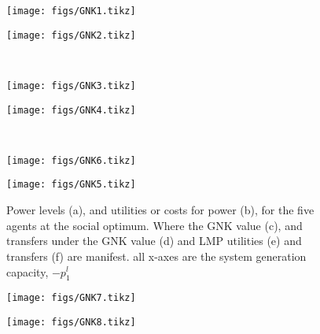     \begin{figure}[]
	\centering
    \begin{minipage}[t]{.48\linewidth}
        \texttt{[image: figs/GNK1.tikz]}
    \end{minipage}
    \begin{minipage}[t]{.48\linewidth}
        \texttt{[image: figs/GNK2.tikz]}
    \end{minipage}\\
    \vspace{5mm}
    \begin{minipage}[t]{.48\linewidth}
        \texttt{[image: figs/GNK3.tikz]}
    \end{minipage}
    \begin{minipage}[t]{.48\linewidth}
        \texttt{[image: figs/GNK4.tikz]}
    \end{minipage}\\
    \vspace{5mm}
    \begin{minipage}[t]{.48\linewidth}
        \texttt{[image: figs/GNK6.tikz]}
    \end{minipage}
    \begin{minipage}[t]{.48\linewidth}
        \texttt{[image: figs/GNK5.tikz]}
    \end{minipage}
    \vspace{0.3\baselineskip}
    \caption{Power levels (a), and utilities or costs for power (b), for the five agents at the social optimum. Where the GNK value (c), and transfers under the GNK value (d) and LMP utilities (e) and transfers (f) are manifest. all x-axes are the system generation capacity, $-p_1^l$}\label{fig:1}
\end{figure}


\begin{figure}
	\centering
        \texttt{[image: figs/GNK7.tikz]}
\end{figure}


\begin{figure}
	\centering
        \texttt{[image: figs/GNK8.tikz]}
\end{figure}

